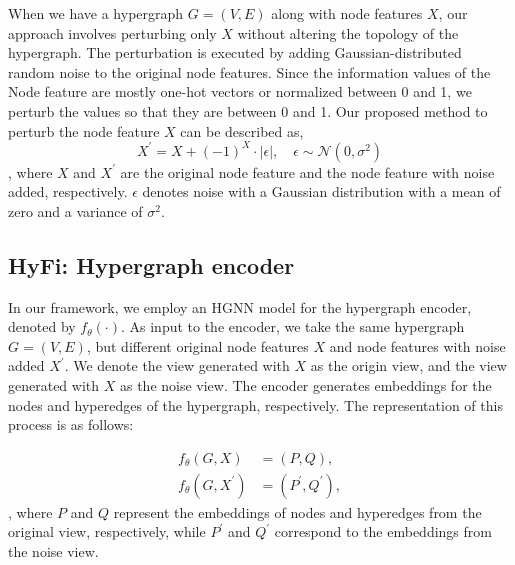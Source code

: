 
When we have a hypergraph \( G = (V, E) \) along with node features \( X \), our approach involves perturbing only \( X \) without altering the topology of the hypergraph. The perturbation is executed by adding Gaussian-distributed random noise to the original node features. Since the information values of the Node feature are mostly one-hot vectors or normalized between 0 and 1, we perturb the values so that they are between 0 and 1. Our proposed method to perturb the node feature $X$ can be described as,
\begin{equation}
\label{equ:add_noise1}
    X^{\prime} = X + (-1)^X \cdot |\epsilon|, \quad \epsilon \sim \mathcal{N}(0, \sigma^2)
\end{equation},
where $X$ and $X^{\prime}$ are the original node feature and the node feature with noise added, respectively. $\epsilon$ denotes noise with a Gaussian distribution with a mean of zero and a variance of $\sigma^2$. 



\subsection{HyFi: Hypergraph encoder}


In our framework, we employ an HGNN model for the hypergraph encoder, denoted by \( f_\theta(\cdot) \). As input to the encoder, we take the same hypergraph \( G = (V, E)\), but different original node features $X$ and node features with noise added $X^{\prime}$. We denote the view generated with $X$ as the origin view, and the view generated with $X$ as the noise view. The encoder generates embeddings for the nodes and hyperedges of the hypergraph, respectively. The representation of this process is as follows:

\begin{equation}
\begin{aligned}
    f_\theta(G, X) &= (P, Q),  \\
    f_\theta(G, X^{\prime}) &= (P^{\prime}, Q^{\prime}),
\end{aligned}
\end{equation},
where \( P \) and \( Q \) represent the embeddings of nodes and hyperedges from the original view, respectively, while \( P^{\prime} \) and \( Q^{\prime} \) correspond to the embeddings from the noise view. 

